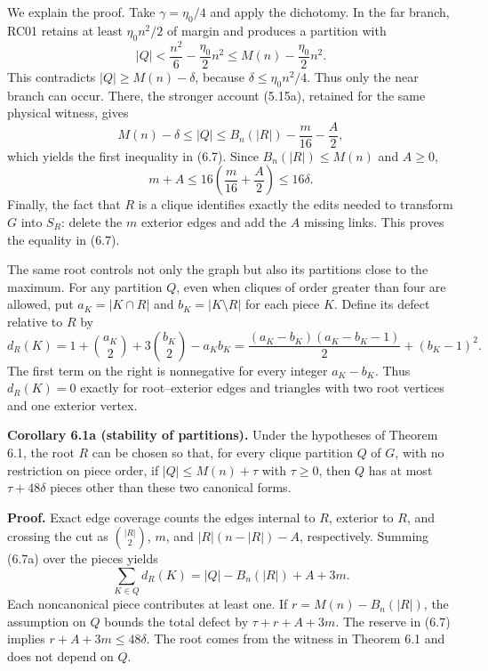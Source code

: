 \documentclass[english,11pt,a4paper]{article}
\begin{document}
We explain the proof. Take \(\gamma=\eta_0/4\) and apply the dichotomy. In the far branch, RC01 retains at least \(\eta_0n^2/2\) of margin and produces a partition with \[
|Q|<\frac{n^2}{6}-\frac{\eta_0}{2}n^2
\le M(n)-\frac{\eta_0}{2}n^2.
\] This contradicts \(|Q|\ge M(n)-\delta\), because \(\delta\le\eta_0n^2/4\). Thus only the near branch can occur. There, the stronger account (5.15a), retained for the same physical witness, gives \[
M(n)-\delta\le |Q|
\le B_n(|R|)-\frac m{16}-\frac A2,
\] which yields the first inequality in (6.7). Since \(B_n(|R|)\le M(n)\) and \(A\ge0\), \[
m+A\le16\left(\frac m{16}+\frac A2\right)\le16\delta.
\] Finally, the fact that \(R\) is a clique identifies exactly the edits needed to transform \(G\) into \(S_R\): delete the \(m\) exterior edges and add the \(A\) missing links. This proves the equality in (6.7).

The same root controls not only the graph but also its partitions close to the maximum. For any partition \(Q\), even when cliques of order greater than four are allowed, put \(a_K=|K\cap R|\) and \(b_K=|K\setminus R|\) for each piece \(K\). Define its defect relative to \(R\) by \[
d_R(K)=1+\binom{a_K}{2}+3\binom{b_K}{2}-a_Kb_K
=\frac{(a_K-b_K)(a_K-b_K-1)}2+(b_K-1)^2.
\tag{6.7a}
\] The first term on the right is nonnegative for every integer \(a_K-b_K\). Thus \(d_R(K)=0\) exactly for root--exterior edges and triangles with two root vertices and one exterior vertex.


\textbf{Corollary 6.1a (stability of partitions).} Under the hypotheses of Theorem 6.1, the root \(R\) can be chosen so that, for every clique partition \(Q\) of \(G\), with no restriction on piece order, if \(|Q|\le M(n)+\tau\) with \(\tau\ge0\), then \(Q\) has at most \(\tau+48\delta\) pieces other than these two canonical forms.

\textbf{Proof.} Exact edge coverage counts the edges internal to \(R\), exterior to \(R\), and crossing the cut as \(\binom{|R|}{2}\), \(m\), and \(|R|(n-|R|)-A\), respectively. Summing (6.7a) over the pieces yields \[
\sum_{K\in Q}d_R(K)=|Q|-B_n(|R|)+A+3m.
\tag{6.7b}
\] Each noncanonical piece contributes at least one. If \(r=M(n)-B_n(|R|)\), the assumption on \(Q\) bounds the total defect by \(\tau+r+A+3m\). The reserve in (6.7) implies \(r+A+3m\le48\delta\). The root comes from the witness in Theorem 6.1 and does not depend on \(Q\).

\end{document}
